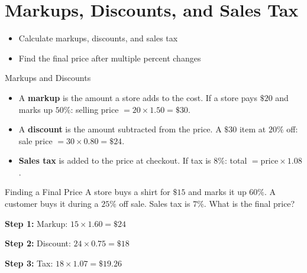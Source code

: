 \section{Markups, Discounts, and Sales Tax}

\begin{learningGoals}
\begin{itemize}
    \item Calculate markups, discounts, and sales tax
    \item Find the final price after multiple percent changes
\end{itemize}
\end{learningGoals}

\begin{conceptBox}{Markups and Discounts}
\begin{itemize}[leftmargin=*]
    \item A \textbf{markup} is the amount a store adds to the cost. If a store pays $\$20$ and marks up $50\%$: selling price $= 20 \times 1.50 = \$30$.
    \item A \textbf{discount} is the amount subtracted from the price. A $\$30$ item at $20\%$ off: sale price $= 30 \times 0.80 = \$24$.
    \item \textbf{Sales tax} is added to the price at checkout. If tax is $8\%$: total $= \text{price} \times 1.08$.
\end{itemize}
\end{conceptBox}

\begin{workedExample}{Finding a Final Price}
A store buys a shirt for $\$15$ and marks it up $60\%$. A customer buys it during a $25\%$ off sale. Sales tax is $7\%$. What is the final price?

\textbf{Step 1:} Markup: $15 \times 1.60 = \$24$

\textbf{Step 2:} Discount: $24 \times 0.75 = \$18$

\textbf{Step 3:} Tax: $18 \times 1.07 = \$19.26$
\end{workedExample}


